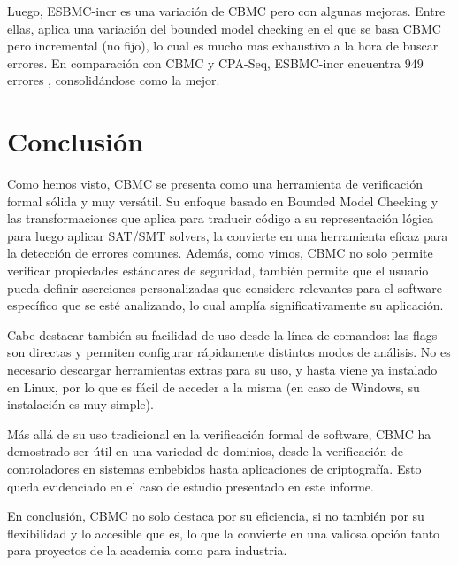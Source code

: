 \documentclass[runningheads]{llncs}
\begin{document}
Luego, ESBMC-incr es una variación de CBMC pero con algunas mejoras.
Entre ellas, aplica una variación del bounded model checking en el que se basa CBMC pero incremental (no fijo), lo cual es mucho mas exhaustivo a la hora de buscar errores.
En comparación con CBMC y CPA-Seq, ESBMC-incr encuentra $949$ errores \cite{cbmc-comparison}, consolidándose como la mejor.

\section{Conclusión}
Como hemos visto, CBMC se presenta como una herramienta de verificación formal sólida y muy versátil.
Su enfoque basado en Bounded Model Checking y las transformaciones que aplica para traducir código a su representación lógica para luego aplicar SAT/SMT solvers, la convierte en una herramienta eficaz para la detección de errores comunes.
Además, como vimos, CBMC no solo permite verificar propiedades estándares de seguridad, también permite que el usuario pueda definir aserciones personalizadas que considere relevantes para el software específico que se esté analizando, lo cual amplía significativamente su aplicación.

Cabe destacar también su facilidad de uso desde la línea de comandos: las flags son directas y permiten configurar rápidamente distintos modos de análisis.
No es necesario descargar herramientas extras para su uso, y hasta viene ya instalado en Linux, por lo que es fácil de acceder a la misma (en caso de Windows, su instalación es muy simple).

Más allá de su uso tradicional en la verificación formal de software, CBMC ha demostrado ser útil en una variedad de dominios, desde la verificación de controladores en sistemas embebidos hasta aplicaciones de criptografía.
Esto queda evidenciado en el caso de estudio presentado en este informe.

En conclusión, CBMC no solo destaca por su eficiencia, si no también por su flexibilidad y lo accesible que es, lo que la convierte en una valiosa opción tanto para proyectos de la academia como para industria.



\end{document}
